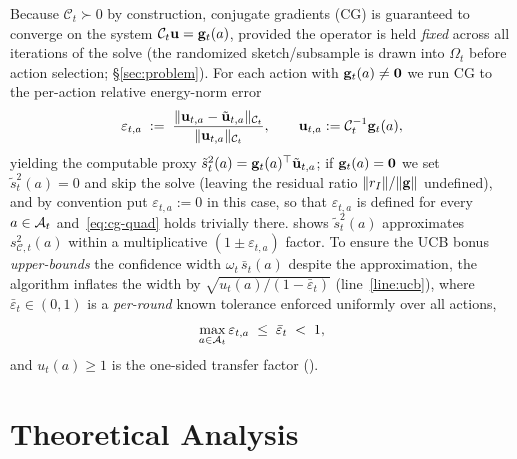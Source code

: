 \documentclass[twoside]{article}
\newcommand{\Calg}{\mathcal{C}}                 %
\begin{document}
Because $\Calg_t\succ 0$ by construction, conjugate gradients (CG) is guaranteed
to converge on the system $\Calg_t\bu=\bg_t(a)$, provided the operator is held
\emph{fixed} across all iterations of the solve (the randomized sketch/subsample
is drawn into $\Omega_t$ before action selection; \S\ref{sec:problem}).  For each
action with $\mathbf{g}_t(a)\ne\mathbf0$ we run CG to the per-action relative
energy-norm error
\begin{equation}\label{eq:cg-err-eta}
  \varepsilon_{t,a}
  \;:=\;
  \frac{\|\bu_{t,a}-\tilde\bu_{t,a}\|_{\Calg_t}}{\|\bu_{t,a}\|_{\Calg_t}},
  \qquad
  \bu_{t,a}:=\Calg_t^{-1}\bg_t(a),
\end{equation}
yielding the computable proxy $\tilde{s}_t^2(a)=\mathbf{g}_t(a)^\top\tilde{\mathbf{u}}_{t,a}$;
if $\mathbf{g}_t(a)=\mathbf0$ we set $\tilde{s}_t^2(a)=0$ and skip the solve (leaving the
residual ratio $\|r_I\|/\|\mathbf{g}\|$ undefined), and by convention put
$\varepsilon_{t,a}:=0$ in this case, so that $\varepsilon_{t,a}$ is defined for
every $a\in\mathcal{A}_t$ and~\eqref{eq:cg-quad} holds trivially there.
 shows $\tilde{s}_t^2(a)$ approximates $s_{\Calg,t}^2(a)$ within a
multiplicative $(1\pm\varepsilon_{t,a})$ factor.  To ensure the UCB bonus
\emph{upper-bounds} the confidence width $\omega_t\,\bar s_t(a)$ despite the
approximation, the algorithm inflates the width by
$\sqrt{u_t(a)/(1-\bar\varepsilon_t)}$ (line~\ref{line:ucb}), where
$\bar\varepsilon_t\in(0,1)$ is a \emph{per-round} known tolerance enforced
uniformly over all actions,
\begin{equation}\label{eq:cg-tol-uniform}
  \max_{a\in\mathcal{A}_t}\varepsilon_{t,a}
  \;\le\;\bar\varepsilon_t\;<\;1,
\end{equation}
and $u_t(a)\ge1$ is the one-sided transfer factor ().

\section{Theoretical Analysis}\label{sec:theory}
\end{document}
